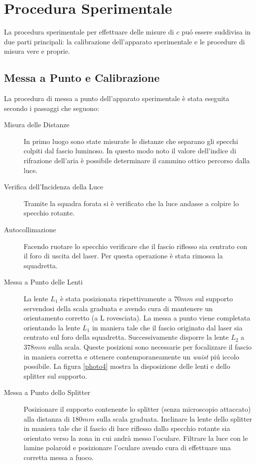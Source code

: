 \documentclass[a4paper,11pt]{article}
\begin{document}
\section{Procedura Sperimentale}

La procedura sperimentale per effettuare delle misure di $c$ pu\'o essere suddivisa in due parti principali: la calibrazione dell'apparato sperimentale e le procedure di misura vere e proprie.

\subsection{Messa a Punto e Calibrazione}

La procedura di messa a punto dell'apparato sperimentale è stata eseguita secondo i passaggi che seguono:

\begin{description}
	\item[Misura delle Distanze] In primo luogo sono state misurate le distanze che separano gli specchi colpiti dal fascio luminoso. In questo modo noto il valore dell'indice di rifrazione dell'aria è possibile determinare il cammino ottico percorso dalla luce.
	\item[Verifica dell'Incidenza della Luce] Tramite la squadra forata si è verificato che la luce andasse a colpire lo specchio rotante.
	\item[Autocollimazione] Facendo ruotare lo specchio verificare che il fascio riflesso sia centrato con il foro di uscita del laser. Per questa operazione è stata rimossa la squadretta.
	\item[Messa a Punto delle Lenti] La lente $L_1$ è stata posizionata rispettivamente a $70mm$ sul supporto servendosi della scala graduata e avendo cura di mantenere un orientamento corretto (a L rovesciata). La messa a punto viene completata orientando la lente $L_1$ in maniera tale che il fascio originato dal laser sia centrato sul foro della squadretta. Successivamente disporre la lente $L_2$ a $378mm$ sulla scala. Queste posizioni sono necessarie per focalizzare il fascio in maniera corretta e ottenere contemporaneamente un \textit{waist} pi\'u iccolo possibile. La figura \ref{photo4} mostra la disposizione delle lenti e dello splitter sul supporto.
	\item[Messa a Punto dello Splitter] Posizionare il supporto contenente lo splitter (senza microscopio attaccato) alla distanza di $180mm$ sulla scala graduata. Inclinare la lente dello splitter in maniera tale che il fascio di luce riflesso dallo specchio rotante sia orientato verso la zona in cui andrà messo l'oculare. Filtrare la luce con le lamine polaroid e posizionare l'oculare avendo cura di effettuare una corretta messa a fuoco.

\end{description}
\end{document}
